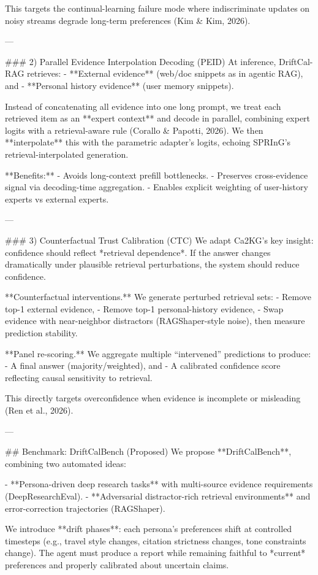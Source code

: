 This targets the continual-learning failure mode where indiscriminate updates on noisy streams degrade long-term preferences (Kim & Kim, 2026).

---

### 2) Parallel Evidence Interpolation Decoding (PEID)  
At inference, DriftCal-RAG retrieves:  
- **External evidence** (web/doc snippets as in agentic RAG), and  
- **Personal history evidence** (user memory snippets).

Instead of concatenating all evidence into one long prompt, we treat each retrieved item as an **expert context** and decode in parallel, combining expert logits with a retrieval-aware rule (Corallo & Papotti, 2026). We then **interpolate** this with the parametric adapter’s logits, echoing SPRInG’s retrieval-interpolated generation.

**Benefits:**  
- Avoids long-context prefill bottlenecks.  
- Preserves cross-evidence signal via decoding-time aggregation.  
- Enables explicit weighting of user-history experts vs external experts.

---

### 3) Counterfactual Trust Calibration (CTC)  
We adapt Ca2KG’s key insight: confidence should reflect *retrieval dependence*. If the answer changes dramatically under plausible retrieval perturbations, the system should reduce confidence.

**Counterfactual interventions.** We generate perturbed retrieval sets:  
- Remove top-1 external evidence,  
- Remove top-1 personal-history evidence,  
- Swap evidence with near-neighbor distractors (RAGShaper-style noise),  
then measure prediction stability.

**Panel re-scoring.** We aggregate multiple “intervened” predictions to produce:  
- A final answer (majority/weighted), and  
- A calibrated confidence score reflecting causal sensitivity to retrieval.

This directly targets overconfidence when evidence is incomplete or misleading (Ren et al., 2026).

---

## Benchmark: DriftCalBench (Proposed)  
We propose **DriftCalBench**, combining two automated ideas:

- **Persona-driven deep research tasks** with multi-source evidence requirements (DeepResearchEval).  
- **Adversarial distractor-rich retrieval environments** and error-correction trajectories (RAGShaper).  

We introduce **drift phases**: each persona’s preferences shift at controlled timesteps (e.g., travel style changes, citation strictness changes, tone constraints change). The agent must produce a report while remaining faithful to *current* preferences and properly calibrated about uncertain claims.

